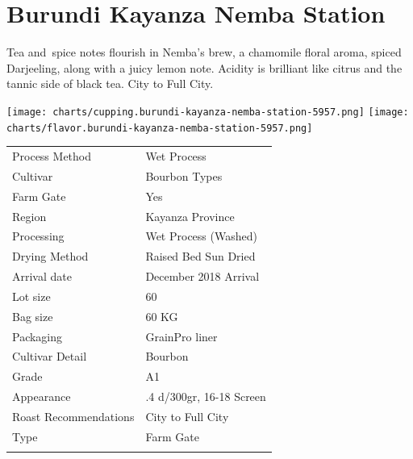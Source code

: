 \documentclass[10pt,twoside,footinclude=true,headinclude=true]{scrbook} %
\newlength{\mysize}
\newcommand{\myfontsize}[1]{
  \setlength{\mysize}{#1pt}
  \fontsize{\mysize}{1.2\mysize}
  \selectfont
}
\begin{document}

\chapter*{Burundi Kayanza Nemba Station}
 
\begin{addmargin}[2.2em]{2.2em}
\small
\justify
Tea and spice notes flourish in Nemba's brew, a chamomile floral aroma, spiced Darjeeling, along with a juicy lemon note. Acidity is brilliant like citrus and the tannic side of black tea. City to Full City.
\end{addmargin}

\centering
\vspace{2em}
\texttt{[image: charts/cupping.burundi-kayanza-nemba-station-5957.png]}
\texttt{[image: charts/flavor.burundi-kayanza-nemba-station-5957.png]}

\vspace{1em}
\begin{table}[htbp]
\myfontsize{7}
\hspace*{2.2em}
\begin{tabular}{ >{\raggedleft\arraybackslash}p{3.6cm}!{\color{lightgray}\vrule}p{7cm} }
\hline
  Process Method & Wet Process \\
  \hline
  Cultivar & Bourbon Types \\
  \hline
  Farm Gate & Yes \\
  \hline
  Region & Kayanza Province \\
  \hline
  Processing & Wet Process (Washed) \\
  \hline
  Drying Method & Raised Bed Sun Dried \\
  \hline
  Arrival date & December 2018 Arrival \\
  \hline
  Lot size & 60 \\
  \hline
  Bag size & 60 KG \\
  \hline
  Packaging & GrainPro liner \\
  \hline
  Cultivar Detail & Bourbon \\
  \hline
  Grade & A1 \\
  \hline
  Appearance & .4 d/300gr, 16-18 Screen \\
  \hline
  Roast Recommendations & City to Full City \\
  \hline
  Type & Farm Gate \\
  \hline

\end{tabular}
\end{table}
\end{document}
